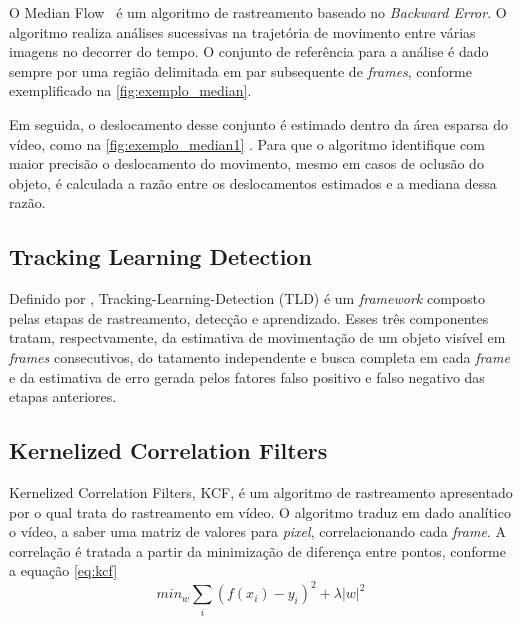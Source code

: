 \documentclass[12pt,oneside,a4paper,chapter=TITLE,section=TITLE,sumario=tradicional]{abntex2}
\begin{document}
O Median Flow~\cite{Kalal10forward-backwarderror} é um algoritmo de rastreamento baseado no \textit{Backward Error}. O algoritmo realiza análises sucessivas na trajetória de movimento entre várias imagens no decorrer do tempo.
O conjunto de referência para a análise é dado sempre por uma região delimitada em par subsequente de \textit{frames}, conforme exemplificado na \autoref{fig:exemplo_median}.

\begin{figure}[htb]
\end{figure}

Em seguida, o deslocamento desse conjunto é estimado dentro da área esparsa do vídeo, como na \autoref{fig:exemplo_median1} . Para que o algoritmo identifique com maior precisão o deslocamento do movimento, mesmo em casos de oclusão do objeto, é calculada a razão entre os deslocamentos estimados e a mediana dessa razão. 
\begin{figure}[htb]
\end{figure}

\subsection{Tracking Learning Detection}
Definido por \cite{kalal2012tracking}, Tracking-Learning-Detection (TLD) é um \textit{framework} composto pelas etapas de rastreamento, detecção e aprendizado.
Esses três componentes tratam, respectvamente, da estimativa de movimentação de um objeto visível em \textit{frames} consecutivos, do tatamento independente e busca completa em cada \textit{frame} e da estimativa de erro gerada pelos fatores falso positivo e falso negativo das etapas anteriores.


\subsection{Kernelized Correlation Filters}
Kernelized Correlation Filters, KCF, é um algoritmo de rastreamento apresentado por  o qual trata do rastreamento em vídeo.
O algoritmo traduz em dado analítico o vídeo, a saber uma matriz de valores para \textit{pixel}, correlacionando cada \textit{frame}. A correlação é tratada a partir da minimização de diferença entre pontos, conforme a equação \ref{eq:kcf}
\begin{equation}
\label{eq:kcf}
min_w \sum_i (f(x_i)-y_i)^2+\lambda |w|^2
\end{equation}
\end{document}

